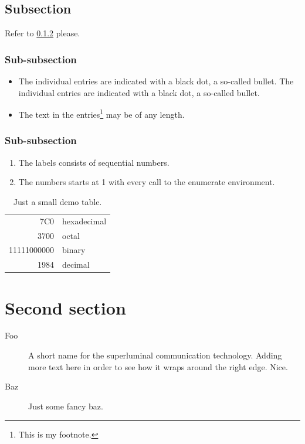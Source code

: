 \documentclass[a4paper,onecolumn,openany]{book}
\begin{document}
\subsection{Subsection}

Refer to \ref{sec:subsubsection} please.

\lipsum[1]

\subsubsection{Sub-subsection}

\begin{itemize}
  \item The individual entries are indicated with a black dot, a so-called bullet.
The individual entries are indicated with a black dot, a so-called bullet.
  \item The text in the entries\footnote{This is my footnote.} may be of any length.
\end{itemize}

\lipsum[2]

\subsubsection{Sub-subsection}

\label{sec:subsubsection}
\begin{enumerate}
  \item The labels consists of sequential numbers.
  \item The numbers starts at 1 with every call to the enumerate environment.
\end{enumerate}

\begin{table}[hb]
    \centering
    \begin{tabular}{|r|l|}
        \hline
        7C0 & hexadecimal \\
        3700 & octal \\ \cline{2-2}
        11111000000 & binary \\
        \hline \hline
        1984 & decimal \\
        \hline
    \end{tabular}
    \caption{Just a small demo table.}
\end{table}

\section{Second section}
\begin{description}
\item[Foo] A short name for the superluminal communication technology.
Adding more text here in order to see how it wraps around the right edge. Nice.
\item[Baz] Just some fancy baz.
\end{description}
\end{document}
